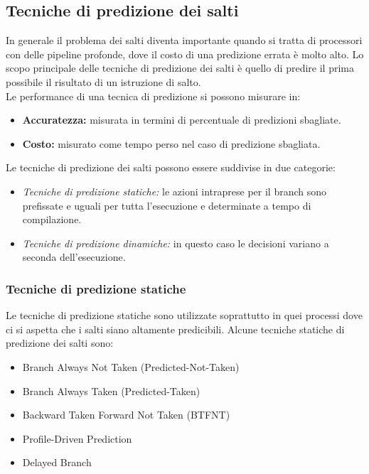 \subsection{Tecniche di predizione dei salti}
In generale il problema dei salti diventa importante quando si tratta di processori con delle pipeline profonde, dove il costo di una predizione errata è molto alto. Lo scopo principale delle tecniche di predizione dei salti è quello di predire il prima possibile il risultato di un istruzione di salto.\\
Le performance di una tecnica di predizione si possono misurare in:
\begin{itemize}
\item \textbf{Accuratezza:} misurata in termini di percentuale di predizioni sbagliate.
\item \textbf{Costo:} misurato come tempo perso nel caso di predizione sbagliata.
\end{itemize}
Le tecniche di predizione dei salti possono essere suddivise in due categorie:
\begin{itemize}
\item \emph{Tecniche di predizione statiche:} le azioni intraprese per il branch sono prefissate e uguali per tutta l'esecuzione e determinate a tempo di compilazione.
\item \emph{Tecniche di predizione dinamiche:} in questo caso le decisioni variano a seconda dell'esecuzione.
\end{itemize}
\subsubsection{Tecniche di predizione statiche}
Le tecniche di predizione statiche sono utilizzate soprattutto in quei processi dove ci si aspetta che i salti siano altamente predicibili. Alcune tecniche statiche di predizione dei salti sono:
\begin{itemize}
\item Branch Always Not Taken (Predicted-Not-Taken)
\item Branch Always Taken (Predicted-Taken)
\item Backward Taken Forward Not Taken (BTFNT)
\item Profile-Driven Prediction
\item Delayed Branch
\end{itemize}
